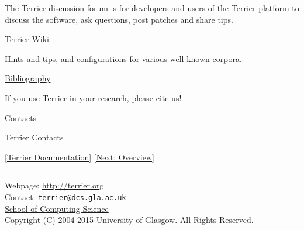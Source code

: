 The Terrier discussion forum is for developers and users of the Terrier
platform to discuss the software, ask questions, post patches and share
tips.

\href{http://ir.dcs.gla.ac.uk/wiki/Terrier}{Terrier Wiki}

Hints and tips, and configurations for various well-known corpora.

\href{bibliography.html}{Bibliography}

If you use Terrier in your research, please cite us!

\href{contacts.html}{Contacts}

Terrier Contacts

{[}\href{index.html}{Terrier Documentation}{]}
{[}\href{overview.html}{Next: Overview}{]}

\begin{center}\rule{0.5\linewidth}{\linethickness}\end{center}

Webpage: \url{http://terrier.org}\\
Contact:
\href{mailto:terrier@dcs.gla.ac.uk}{\nolinkurl{terrier@dcs.gla.ac.uk}}\\
\href{http://www.dcs.gla.ac.uk/}{School of Computing Science}\\
Copyright (C) 2004-2015 \href{http://www.gla.ac.uk/}{University of
Glasgow}. All Rights Reserved.

~
